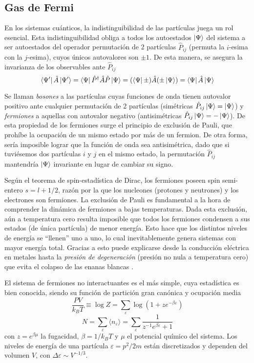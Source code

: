 \subsection{Gas de Fermi}{\label{sec:intro_fermi_gas}}

En los sistemas cuánticos, la indistinguibilidad de las partículas juega un rol esencial.
Esta indistinguibilidad obliga a todos los autoestados $\ket{\Psi}$ del sistema a ser autoestados del operador permutación de 2 partículas $\hat{P}_{ij}$ (permuta la $i$-esima con la $j$-esima), cuyos únicos autovalores son $\pm 1$.
De esta manera, se asegura la invarianza de los observables ante $\hat{P}_{ij}$
\[\bra{\Psi'}\hat{A}\ket{\Psi'} = \bra{\Psi}\hat{P}^\dagger\hat{A}\hat{P}\ket{\Psi} = (\bra{\Psi}\pm)\hat{A}(\pm\ket{\Psi}) = \bra{\Psi}\hat{A}\ket{\Psi}\]

Se llaman \textit{bosones} a las partículas cuyas funciones de onda tienen autovalor positivo ante cualquier permutación de 2 partículas (simétricas $\hat{P}_{ij}\ket{\Psi} = \ket{\Psi}$) y \textit{fermiones} a aquellas con autovalor negativo (antisimétricas $\hat{P}_{ij}\ket{\Psi} = -\ket{\Psi}$).
De esta propiedad de los fermiones surge el principio de exclusión de Pauli, que prohíbe la ocupación de un mismo estado por más de un fermion.
De otra forma, sería imposible lograr que la función de onda sea antisimétrica, dado que si tuviésemos dos partículas $i$ y $j$ en el mismo estado, la permutación $\hat{P}_{ij}$ mantendría
$\ket{\Psi}$ invariante en lugar de cambiar su signo.

Según el teorema de spin-estadística de Dirac, los fermiones poseen spin semi-entero $s=l+1/2$, razón por la que los nucleones (protones y neutrones) y los electrones son fermiones.
La exclusión de Pauli es fundamental a la hora de comprender la dinámica de fermiones a bajas temperaturas.
Dada esta exclusión, aún a temperatura cero resulta imposible que todos los fermiones condensen a sus estados (de única partícula) de menor energía. 
Esto hace que los distintos niveles de energía se ``llenen'' uno a uno, lo cual inevitablemente genera sistemas con mayor energía total.
Gracias a esto puede explicarse desde la conducción eléctrica en metales\cite[pp. 247]{BOOK:PATHRIA} hasta la \textit{presión de degeneración} 
(presión no nula a temperatura cero) que evita el colapso de las enanas blancas \cite[pp2. 59]{BOOK:PATHRIA}.

El sistema de fermiones no interactuantes es el más simple, cuya estadística es bien conocida, siendo su función de partición gran canónica y ocupación media\cite[pp. 231]{BOOK:PATHRIA}
\begin{equation}
 \frac{PV}{k_BT} \equiv \log Z = \sum_\varepsilon \log(1+ze^{-\beta\varepsilon})
\end{equation}
\begin{equation}
 N = \sum_\varepsilon \langle n_\varepsilon\rangle = \sum_\varepsilon \frac{1}{z^{-1}e^{\beta\varepsilon}+1}
\end{equation}
con $z=e^{\beta\mu}$ la fugacidad, $\beta=1/k_BT$ y $\mu$ el potencial químico del sistema.
Los niveles de energía de una partícula $\varepsilon=p^2/2m$ están discretizados y dependen del volumen $V$, con $\Delta\varepsilon\sim V^{-1/3}$.


